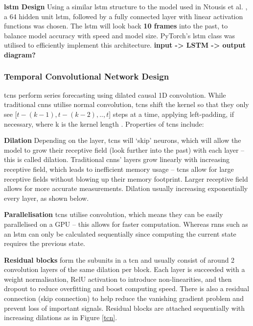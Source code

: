 \documentclass{report_template_oxford}
\begin{document}
\textbf{\gls{lstm} Design} \quad Using a similar \gls{lstm} structure to the model used in Ntousis et al. \cite{ntousis}, a 64 hidden unit \gls{lstm}, followed by a fully connected layer with linear activation functions was chosen. The \gls{lstm} will look back \textbf{10 frames} into the past, to balance model accuracy with speed and model size. PyTorch’s \gls{lstm} class was utilised to efficiently implement this architecture. \textbf{input -> LSTM -> output diagram?}

\subsubsection{Temporal Convolutional Network Design}

\glspl{tcn} perform series forecasting using dilated causal 1D convolution. While traditional \glspl{cnn} utilise normal convolution, \glspl{tcn} shift the kernel so that they only see [\(t-(k-1),t-(k-2),..,t\)] steps at a time, applying left-padding, if necessary, where k is the kernel length \cite{tcn_medium}. Properties of \glspl{tcn} include: 

\textbf{Dilation} \quad  Depending on the layer, \glspl{tcn} will ‘skip’ neurons, which will allow the model to grow their receptive field (look further into the past) with each layer – this is called dilation. Traditional \glspl{cnn}’ layers grow linearly with increasing receptive field, which leads to inefficient memory usage – \glspl{tcn} allow for large receptive fields without blowing up their memory footprint. Larger receptive field allows for more accurate measurements. Dilation usually increasing exponentially every layer, as shown below.

\textbf{Parallelisation} \quad \glspl{tcn} utilise convolution, which means they can be easily parallelised on a GPU – this allows for faster computation. Whereas \glspl{rnn} such as an \gls{lstm} can only be calculated sequentially since computing the current state requires the previous state.

\textbf{Residual blocks} \quad form the subunits in a \gls{tcn} and usually consist of around 2 convolution layers of the same dilation per block. Each layer is succeeded with a weight normalisation, RelU activation to introduce non-linearities, and then dropout to reduce overfitting and boost computing speed. There is also a residual connection (skip connection) to help reduce the vanishing gradient problem and prevent loss of important signals. Residual blocks are attached sequentially with increasing dilations as in Figure \ref{tcn}. 
\end{document}
